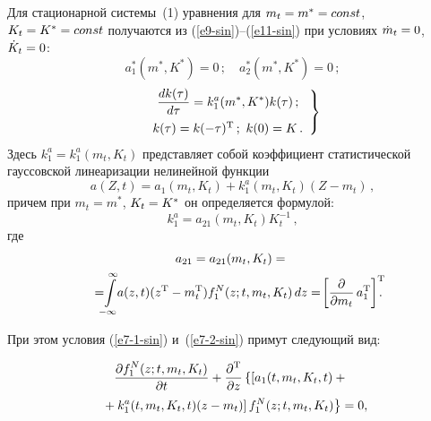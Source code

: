 \begin{multicols}{2}
     Для стационарной сис\-те\-мы~(1) уравнения для $m_t\hm=m^*\hm=const$, 
$K_t\hm=K^*\hm=const$ получаются из (\ref{e9-sin})--(\ref{e11-sin}) при 
усло\-ви\-ях $\dot{m}_t\hm=0$, $\dot{K}_t\hm=0$:
     \begin{equation}
     a_1^* (m^*,K^*)=0\,;\quad a_2^*(m^*,K^*)=0\,;\label{e12-sin}
     \end{equation}
     \begin{equation}
     \left.
     \begin{array}{c}
     \fr{dk(\tau)}{d\tau} =k_1^a(m^*, K^*)k(\tau)\,;\\[9pt]
      k(\tau)=k(-\tau)^{\mathrm{T}}\,;\ 
k(0)=K\,.
\end{array}
\right\}
\label{e13-sin}
     \end{equation}
    Здесь $k_1^a=k_1^a(m_t,K_t)$ представляет собой коэффициент 
статистической гауссовской линеаризации нелинейной функ\-ции
  \begin{equation*}
  a(Z,t) =a_1(m_t,K_t)+k_1^a(m_t,K_t)(Z-m_t)\,,
  \end{equation*}
причем при $m_t=m^*$, $K_t\hm=K^*$ он определяется формулой:
\begin{equation*}
k_1^a=a_{21}(m_t,K_t) K_t^{-1}\,,
\end{equation*}
где
\begin{multline*}
a_{21}=a_{21}(m_t,K_t) ={}\\
{}=\!\!\!\int\limits_{-\infty}^\infty\!\! a(z,t)(z^{\mathrm{T}}-m_t^{\mathrm{T}}) 
f_1^N(z;t,m_t,K_t)\,dz%
= \!\left[ \fr{\partial}{\partial m_t}\,a_1^{\mathrm{T}}\right]^{\mathrm{T}}\!\!\!\!.\hspace*{-7.34363pt}
\end{multline*}
      \renewcommand{\theequation}{\arabic{equation}$^{\prime}$}
  
  \noindent
  При этом условия (\ref{e7-1-sin}) и~(\ref{e7-2-sin}) примут следующий вид:
  \pagebreak
  
  \noindent
  \begin{multline}
  \fr{\partial f_1^N (z;t,m_t,K_t)}{\partial t}+\fr{\partial^{\mathrm{T}}}{\partial z}\left\{ \left[ 
a_1(t,m_t,K_t, t) +{}\right.\right.\\
\hspace*{-2.5mm}\left.\left.{}+k_1^a(t,m_t,K_t,t)(z-m_t)\right] f_1^N (z; t,m_t,K_t)\right\}=0,\!\!\!\!\!
  \label{e17-1-sin}
  \end{multline}
    \renewcommand{\theequation}{\arabic{equation}$^{\prime\prime}$}
    \setcounter{equation}{12}
    

\end{multicols}
